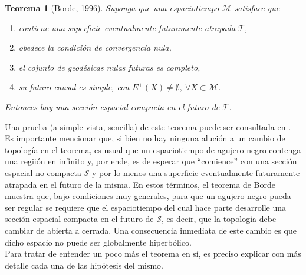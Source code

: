 \documentclass[16pt,a4paper]{article}
\numberwithin{equation}{section}
\newtheorem{theorem}{Teorema}[section]
\theoremstyle{definition}
\begin{document}
\begin{theorem}[Borde, 1996]
	\label{borde reg thm}
	Suponga que una espaciotiempo $\mathcal{M}$ satisface que
	
	\begin{enumerate}[i]
		\item contiene una superficie eventualmente futuramente atrapada $\mathcal{T}$,
		
		\item obedece la condición de convergencia nula,
		
		\item el cojunto de geodésicas nulas futuras es completo,
		
		\item su futuro causal es simple, con $E^{+}(X) \neq \emptyset,\ \forall X \subset \mathcal{M}$.
	\end{enumerate}
	
	Entonces hay una sección espacial compacta en el futuro de $\mathcal{T}$.
\end{theorem}

Una prueba (a simple vista, sencilla) de este teorema puede ser consultada en \cite{borde1996}. Es importante mencionar que, si bien no hay ninguna alución a un cambio de topología en el teorema, es usual que un espaciotiempo de agujero negro contenga una regiión en infinito y, por ende, es de esperar que ``comience'' con una sección espacial no compacta $\mathcal{S}$ y por lo menos una superficie eventualmente futuramente atrapada en el futuro de la misma. En estos términos, el teorema de Borde muestra que, bajo condiciones muy generales, para que un agujero negro pueda ser regular se requiere que el espaciotiempo del cual hace parte desarrolle una sección espacial compacta en el futuro de $\mathcal{S}$, es decir, que la topología debe cambiar de abierta a cerrada. Una consecuencia inmediata de este cambio es que dicho espacio no puede ser globalmente hiperbólico.\\

Para tratar de entender un poco más el teorema en sí, es preciso explicar con más detalle cada una de las hipótesis del mismo.\\
\end{document}
